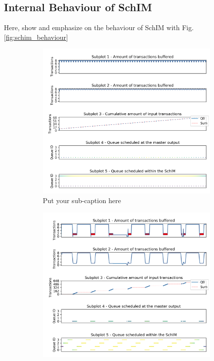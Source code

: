   \subsection{Internal Behaviour of SchIM}
    Here, show and emphasize on the behaviour of SchIM with Fig.\ref{fig:schim_behaviour}
    \begin{figure}
      \begin{subfigure}{.3\textwidth}
        \centering
        \includegraphics[scale=0.31]{../doc/experiments/buffering_4c_15_08_FP.png}  
        \caption{Put your sub-caption here}
        \label{fig:schim_behaviour_fp}
      \end{subfigure}
      \hfill
      \begin{subfigure}{.3\textwidth}
        \centering
        \includegraphics[scale=0.31]{../doc/experiments/buffering_4c_15_08_TDMA.png}  

\end{subfigure}
\end{figure}
